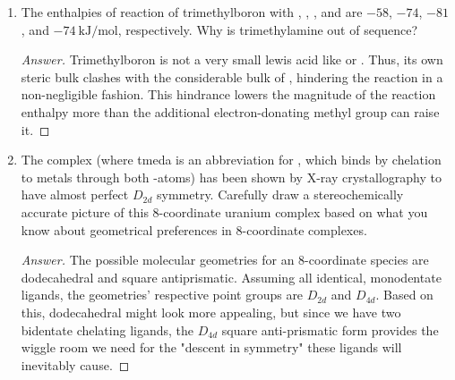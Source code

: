 \documentclass[../psets.tex]{subfiles}
\begin{document}
\begin{enumerate}[label={\Roman*)}]
\begin{enumerate}[label={\textbf{9.\arabic*}}]
        \begin{proof}[Answer]
            From Bent's rule and sterics, we would predict the following structure, which has point group $\boxed{C_{2v}}$.
            \begin{center}
                \chemleft{[}
                \chemright{]^+}
            \end{center}
            Moreover, this structure is supported by the  NMR data, since we have two equivalent (axial) flourines on the same central atom as one nonequivalent fluorine (causing a doublet by the $n+1$ rule of relative intensity 2) and, reversing roles, one (equatorial) flourine on the same central atom as two separate but equivalent fluorines (causing a triplet by the $n+1$ rule of relative intensity 1).
        \end{proof}
    \end{enumerate}
    \newpage
    \item The enthalpies of reaction of trimethylboron with , , , and  are $-58$, $-74$, $-81$, and $\SI[per-mode=symbol]{-74}{\kilo\joule\per\mole}$, respectively. Why is trimethylamine out of sequence?
    \begin{proof}[Answer]
        Trimethylboron is not a very small lewis acid like  or . Thus, its own steric bulk clashes with the considerable bulk of , hindering the reaction in a non-negligible fashion. This hindrance lowers the magnitude of the reaction enthalpy more than the additional electron-donating methyl group can raise it.
    \end{proof}
    \newpage
    \item The complex  (where tmeda is an abbreviation for , which binds by chelation to metals through both -atoms) has been shown by X-ray crystallography to have almost perfect $D_{2d}$ symmetry. Carefully draw a stereochemically accurate picture of this 8-coordinate uranium complex based on what you know about geometrical preferences in 8-coordinate complexes.
    \begin{proof}[Answer]
        The possible molecular geometries for an 8-coordinate species are dodecahedral and square antiprismatic. Assuming all identical, monodentate ligands, the geometries' respective point groups are $D_{2d}$ and $D_{4d}$. Based on this, dodecahedral might look more appealing, but since we have two bidentate chelating ligands, the $D_{4d}$ square anti-prismatic form provides the wiggle room we need for the "descent in symmetry" these ligands will inevitably cause.\par

\end{proof}
\end{enumerate}
\end{document}

